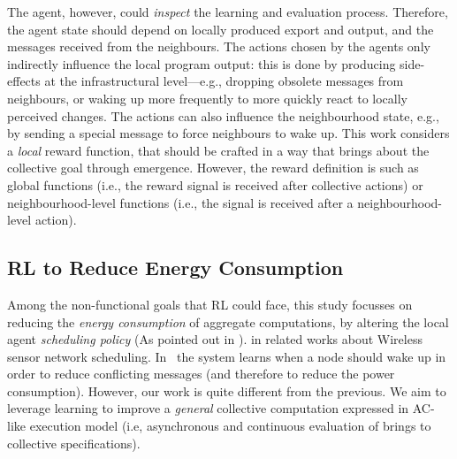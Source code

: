 %
%
The agent, however, could \emph{inspect} the learning and evaluation process. 
 Therefore, the agent state should depend on locally produced export and output, 
 and the messages received from the neighbours.
%
The actions chosen by the agents only indirectly influence the local program output: 
 this is done by producing side-effects at the infrastructural level---e.g., 
 dropping obsolete messages from neighbours, 
 or waking up more frequently to more quickly 
 react to locally perceived changes.
%
The actions can also influence the neighbourhood state, e.g., by sending a special message to force neighbours to wake up.
%
This work considers a \emph{local} reward function, that should be crafted in a way that brings about the collective goal through emergence. 
%
However, the reward definition is   
such as global functions (i.e., the reward signal is received after collective actions) or neighbourhood-level functions (i.e., the signal is received after a neighbourhood-level action).

\subsection{\Acl{RL} to Reduce Energy Consumption}\label{acsos2022:acrl-energy-goal}


Among the non-functional goals that \ac{RL} could face, 
 this study %
 focusses on reducing the \emph{energy consumption} of aggregate computations,
 by altering the local agent \emph{scheduling policy} (As pointed out in ).
%
%
 in related works about Wireless sensor network scheduling.
In~\cite{DBLP:journals/automatica/IwakiWWSJ21,DBLP:journals/ijcnds/MihaylovBTN12} the system learns 
when a node should wake up in order to reduce conflicting messages 
(and therefore to reduce the power consumption). 
However, our work is quite different from the previous. 
We aim to leverage learning to improve a \emph{general} collective computation 
expressed in \ac{AC}-like execution model (i.e, asynchronous and continuous evaluation of  brings to collective specifications).

